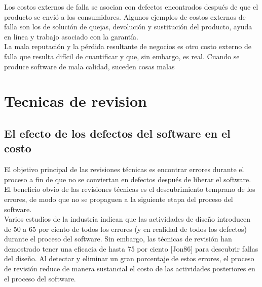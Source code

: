 Los costos externos de falla se asocian con defectos encontrados después de que el producto se envió a los consumidores. Algunos ejemplos de costos externos de falla son los de solución de quejas, devolución y sustitución del producto, ayuda en línea y trabajo asociado con la garantía.\\
La mala reputación y la pérdida resultante de negocios es otro costo externo de falla que resulta difícil de cuantificar y que, sin embargo, es real. Cuando se produce software de mala calidad, suceden cosas malas
\section{Tecnicas de revision}
\subsection{El efecto de los defectos del software en el costo}
 El objetivo principal de las revisiones técnicas es encontrar errores durante el proceso a fin de que no se conviertan en defectos después de liberar el software. El beneficio obvio de las revisiones técnicas es el descubrimiento temprano de los errores, de modo que no se propaguen a la siguiente etapa del proceso del software.\\
Varios estudios de la industria indican que las actividades de diseño introducen de 50 a 65 por ciento de todos los errores (y en realidad de todos los defectos) durante el proceso del software. Sin embargo, las técnicas de revisión han demostrado tener una eficacia de hasta 75 por ciento [Jon86] para descubrir fallas del diseño. Al detectar y eliminar un gran porcentaje de estos errores, el proceso de revisión reduce de manera sustancial el costo de las actividades posteriores en el proceso del software.\\
